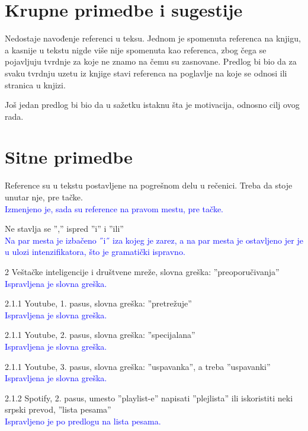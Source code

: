 \documentclass[a4paper]{report}
\newcommand{\odgovor}[1]{\textcolor{blue}{#1}}
\begin{document}
\section{Krupne primedbe i sugestije}
Nedostaje navođenje referenci u teksu. Jednom je spomenuta referenca na knjigu, a kasnije u tekstu nigde više nije spomenuta kao referenca, zbog čega se pojavljuju tvrdnje za koje ne znamo na čemu su zasnovane. Predlog bi bio da za svaku tvrdnju uzetu iz knjige stavi referenca na poglavlje na koje se odnosi ili stranica u knjizi.

Još jedan predlog bi bio da u sažetku istaknu šta je motivacija, odnosno cilj ovog rada.


\section{Sitne primedbe}
Reference su u tekstu postavljene na pogrešnom delu u rečenici. Treba da stoje unutar nje, pre tačke. \\
\odgovor{Izmenjeno je, sada su reference na pravom mestu, pre tačke.}

Ne stavlja se '','' ispred ''i'' i ''ili'' \\
\odgovor{Na par mesta je izbačeno ˝i˝ iza kojeg je zarez, a na par mesta je ostavljeno jer je u ulozi intenzifikatora, što je gramatički ispravno.}

2 Veštačke inteligencije i društvene mreže, slovna greška: ''preoporučivanja'' \\
\odgovor{Ispravljena je slovna greška.}

2.1.1 Youtube, 1. pasus, slovna greška: ''pretrežuje'' \\
\odgovor{Ispravljena je slovna greška.}


2.1.1 Youtube, 2. pasus, slovna greška: ''specijalana'' \\
\odgovor{Ispravljena je slovna greška.}


2.1.1 Youtube, 3. pasus, slovna greška: ''uspavanka'', a treba ''uspavanki'' \\
\odgovor{Ispravljena je slovna greška.}


2.1.2 Spotify, 2. pasus, umesto ''playlist-e'' napisati ''plejlista'' ili iskoristiti neki srpski prevod, ''lista pesama'' \\
\odgovor{Ispravljeno je po predlogu na lista pesama.}
\end{document}

